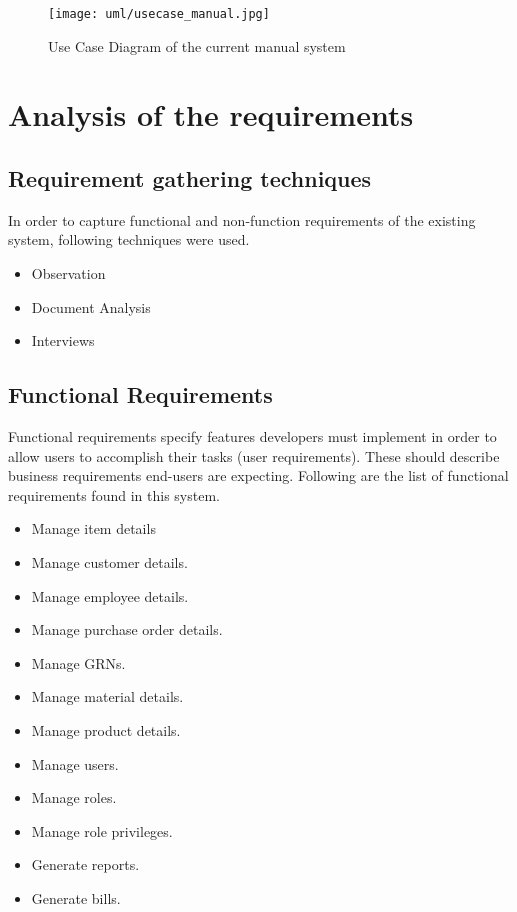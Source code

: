 \documentclass[12pt]{report}
\begin{document}
\begin{figure}[H]
	\centering
	\texttt{[image: uml/usecase\_manual.jpg]}
	\caption{Use Case Diagram of the current manual system}
\end{figure}

\section{Analysis of the requirements}

\subsection{Requirement gathering techniques}
In order to capture functional and non-function requirements of the existing system, following techniques were used.

\begin{itemize}
	\item Observation
	\item Document Analysis
	\item Interviews
\end{itemize}

\subsection{Functional Requirements}
Functional requirements specify features developers must implement in order to allow users to accomplish their tasks (user requirements).  These should describe business requirements end-users are expecting. Following are the list of functional requirements found in this system.

\begin{itemize}
	\item Manage item details
	\item Manage customer details.
	\item Manage employee details.
	\item Manage purchase order details.
	\item Manage GRNs.
	\item Manage material details.
	\item Manage product details.
	\item Manage users.
	\item Manage roles.
	\item Manage role privileges.
	\item Generate reports.
	\item Generate bills.
\end{itemize}
\end{document}
